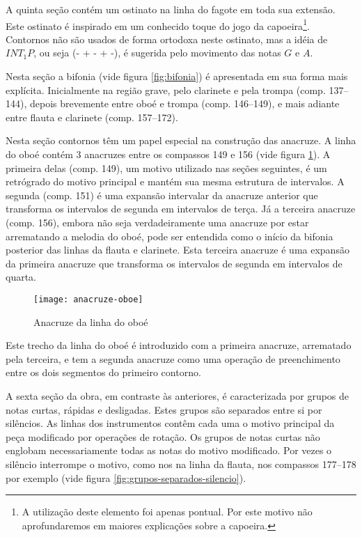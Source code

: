 A quinta seção contém um ostinato na linha do fagote em toda sua
extensão. Este ostinato é inspirado em um conhecido toque do jogo da
capoeira\footnote{A utilização deste elemento foi apenas pontual. Por
  este motivo não aprofundaremos em maiores explicações sobre a
  capoeira.}. Contornos não são usados de forma ortodoxa neste
ostinato, mas a idéia de $INT_1P$, ou seja (- + - + -), é sugerida
pelo movimento das notas $G$ e $A$.

Nesta seção a bifonia (vide figura \ref{fig:bifonia}) é apresentada em
sua forma mais explícita. Inicialmente na região grave, pelo clarinete
e pela trompa (comp. 137--144), depois brevemente entre oboé e trompa
(comp. 146--149), e mais adiante entre flauta e clarinete
(comp. 157--172).

Nesta seção contornos têm um papel especial na construção das
anacruze. A linha do oboé contém 3 anacruzes entre os compassos 149 e
156 (vide figura \ref{fig:anacruze-oboe}). A primeira delas
(comp. 149), um motivo utilizado nas seções seguintes, é um retrógrado
do motivo principal e mantém sua mesma estrutura de intervalos. A
segunda (comp. 151) é uma expansão intervalar da anacruze anterior que
transforma os intervalos de segunda em intervalos de terça. Já a
terceira anacruze (comp. 156), embora não seja verdadeiramente uma
anacruze por estar arrematando a melodia do oboé, pode ser entendida
como o início da bifonia posterior das linhas da flauta e
clarinete. Esta terceira anacruze é uma expansão da primeira anacruze
que transforma os intervalos de segunda em intervalos de quarta.

\begin{figure}
  \centering
  \texttt{[image: anacruze-oboe]}
  \caption{Anacruze da linha do oboé}
  \label{fig:anacruze-oboe}
\end{figure}

Este trecho da linha do oboé é introduzido com a primeira anacruze,
arrematado pela terceira, e tem a segunda anacruze como uma operação
de preenchimento entre os dois segmentos do primeiro contorno.


A sexta seção da obra, em contraste às anteriores, é caracterizada por
grupos de notas curtas, rápidas e desligadas. Estes grupos são
separados entre si por silêncios. As linhas dos instrumentos contêm
cada uma o motivo principal da peça modificado por operações de
rotação. Os grupos de notas curtas não englobam necessariamente todas
as notas do motivo modificado. Por vezes o silêncio interrompe o
motivo, como nos na linha da flauta, nos compassos 177--178 por
exemplo (vide figura \ref{fig:grupos-separados-silencio}).

